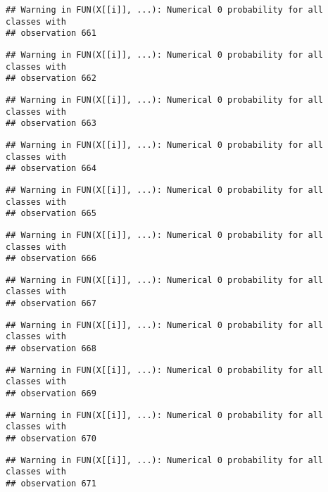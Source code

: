 \documentclass[
]{article}
\begin{document}
\begin{verbatim}
## Warning in FUN(X[[i]], ...): Numerical 0 probability for all classes with
## observation 661
\end{verbatim}

\begin{verbatim}
## Warning in FUN(X[[i]], ...): Numerical 0 probability for all classes with
## observation 662
\end{verbatim}

\begin{verbatim}
## Warning in FUN(X[[i]], ...): Numerical 0 probability for all classes with
## observation 663
\end{verbatim}

\begin{verbatim}
## Warning in FUN(X[[i]], ...): Numerical 0 probability for all classes with
## observation 664
\end{verbatim}

\begin{verbatim}
## Warning in FUN(X[[i]], ...): Numerical 0 probability for all classes with
## observation 665
\end{verbatim}

\begin{verbatim}
## Warning in FUN(X[[i]], ...): Numerical 0 probability for all classes with
## observation 666
\end{verbatim}

\begin{verbatim}
## Warning in FUN(X[[i]], ...): Numerical 0 probability for all classes with
## observation 667
\end{verbatim}

\begin{verbatim}
## Warning in FUN(X[[i]], ...): Numerical 0 probability for all classes with
## observation 668
\end{verbatim}

\begin{verbatim}
## Warning in FUN(X[[i]], ...): Numerical 0 probability for all classes with
## observation 669
\end{verbatim}

\begin{verbatim}
## Warning in FUN(X[[i]], ...): Numerical 0 probability for all classes with
## observation 670
\end{verbatim}

\begin{verbatim}
## Warning in FUN(X[[i]], ...): Numerical 0 probability for all classes with
## observation 671
\end{verbatim}
\end{document}
